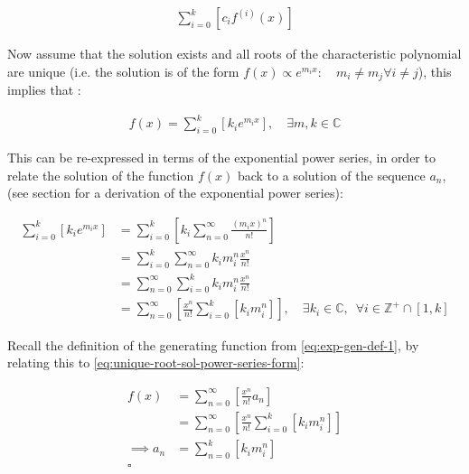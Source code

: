 \documentclass[11pt]{article}
\begin{document}
\begin{align}
   \sum^{k}_{i= 0}   \left[ c_i f^{\left( i \right)}\left( x \right) \right]
\end{align}


Now assume that the solution exists and all roots of the characteristic polynomial are unique (i.e. the solution is of the form \(f{\left({ x }\right)} \propto e^{m_i x}: \quad m_i \neq m_j \forall i\neq j\)), this implies that  \cite[Ch. 4]{zillDifferentialEquations2009a} :

\begin{align}
    f{\left({ x }\right)} = \sum^{k}_{i= 0}   {\left[{ k_i e^{m_i x} }\right]}, \quad \exists m,k \in \mathbb{C} \nonumber
\end{align}

This can be re-expressed in terms of the exponential power series, in order to relate the solution of the function \(f{\left({ x }\right)}\) back to a solution of the sequence \(a_n\), (see section for a derivation of the exponential power series):

\begin{align}
    \sum^{k}_{i= 0}   {\left[{ k_i e^{m_i x}  }\right]}  &= \sum^{k}_{i= 0}   {\left[{ k_i \sum^{\infty}_{n= 0}   \frac{{\left({ m_i x }\right)}^n}{n!}  }\right]}  \nonumber \\
							 &= \sum^{k}_{i= 0}  \sum^{\infty}_{n= 0}   k_i m_i^n \frac{x^n}{n!} \nonumber\\
							 &=    \sum^{\infty}_{n= 0} \sum^{k}_{i= 0}   k_i m_i^n \frac{x^n}{n!} \nonumber \\
							 &= \sum^{\infty}_{n= 0} {\left[{ \frac{x^n}{n!}  \sum^{k}_{i=0}   {\left[{ k_im^n_i }\right]}  }\right]}, \quad \exists k_i \in \mathbb{C}, \enspace \forall i \in \mathbb{Z}^+\cap {\left[{ 1, k }\right]}     \label{eq:unique-root-sol-power-series-form}
\end{align}


Recall the definition of the generating function from \eqref{eq:exp-gen-def-1}, by relating this to \eqref{eq:unique-root-sol-power-series-form}:

\begin{align}
    f{\left({ x }\right)} &= \sum^{\infty}_{n= 0}   {\left[{  \frac{x^n}{n!} a_n }\right]} \nonumber \\
&= \sum^{\infty}_{n= 0} {\left[{ \frac{x^n}{n!}  \sum^{k}_{i=0}   {\left[{ k_im^n_i }\right]}  }\right]}  \nonumber \\
      \implies  a_n &= \sum^{k}_{n= 0} {\left[{ k_im_i^n }\right]}     \nonumber \\ \nonumber
\square
\end{align}
\end{document}
